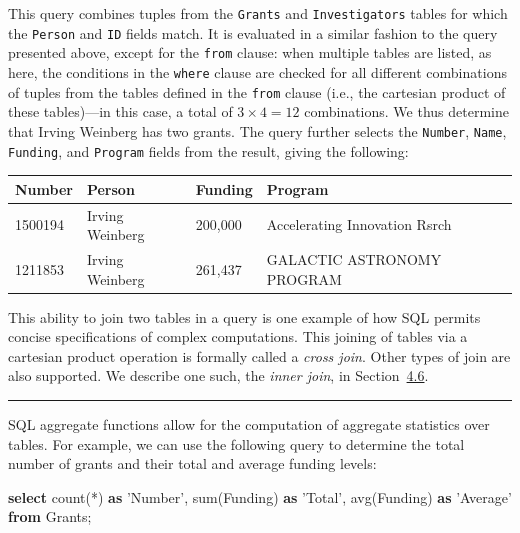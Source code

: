\documentclass[]{krantz}
\newenvironment{Shaded}{\begin{snugshade}}{\end{snugshade}}
\newcommand{\KeywordTok}[1]{\textcolor[rgb]{0.13,0.29,0.53}{\textbf{#1}}}
\newcommand{\StringTok}[1]{\textcolor[rgb]{0.31,0.60,0.02}{#1}}
\newcommand{\FunctionTok}[1]{\textcolor[rgb]{0.00,0.00,0.00}{#1}}
\newcommand{\NormalTok}[1]{#1}
\begin{document}
This query combines tuples from the \texttt{Grants} and
\texttt{Investigators} tables for which the \texttt{Person} and
\texttt{ID} fields match. It is evaluated in a similar fashion to the
query presented above, except for the \texttt{from} clause: when
multiple tables are listed, as here, the conditions in the
\texttt{where} clause are checked for all different combinations of
tuples from the tables defined in the \texttt{from} clause (i.e., the
cartesian product of these tables)---in this case, a total of
\(3\times 4 = 12\) combinations. We thus determine that Irving Weinberg
has two grants. The query further selects the \texttt{Number},
\texttt{Name}, \texttt{Funding}, and \texttt{Program} fields from the
result, giving the following:

\begin{longtable}[]{@{}llll@{}}
\toprule
\textbf{Number} & \textbf{Person} & \textbf{Funding} &
\textbf{Program}\tabularnewline
\midrule
\endhead
1500194 & Irving Weinberg & 200,000 & Accelerating Innovation
Rsrch\tabularnewline
1211853 & Irving Weinberg & 261,437 & GALACTIC ASTRONOMY
PROGRAM\tabularnewline
\bottomrule
\end{longtable}

This ability to join two tables in a query is one example of how SQL
permits concise specifications of complex computations. This joining of
tables via a cartesian product operation is formally called a
\emph{cross join}. Other types of join are also supported. We describe
one such, the \emph{inner join}, in
Section~\protect\hyperlink{sec:db:spatial}{4.6}.

\begin{center}\rule{0.5\linewidth}{\linethickness}\end{center}

SQL aggregate functions allow for the computation of aggregate
statistics over tables. For example, we can use the following query to
determine the total number of grants and their total and average funding
levels:

\begin{Shaded}
\begin{Highlighting}[]
\KeywordTok{select} \FunctionTok{count}\NormalTok{(*) }\KeywordTok{as} \StringTok{'Number'}\NormalTok{, }\FunctionTok{sum}\NormalTok{(Funding) }\KeywordTok{as} \StringTok{'Total'}\NormalTok{,}
       \FunctionTok{avg}\NormalTok{(Funding) }\KeywordTok{as} \StringTok{'Average'}
\KeywordTok{from}\NormalTok{ Grants;}
\end{Highlighting}
\end{Shaded}
\end{document}
